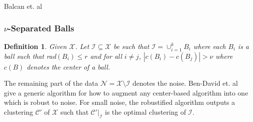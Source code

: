 \documentclass[twoside]{article}
\newcommand{\mc}{\mathcal}
\newtheorem{definition}[theorem]{Definition}
\begin{document}
Balcan et. al \cite{balcan2008discriminative}



\subsubsection*{$\nu$-Separated Balls \cite{ben2014clustering}}
\begin{definition}
Given $\mc X$. Let $\mc I \subseteq \mc X$ be such that $\mc I = \cup_{i=1}^k B_i$ where each $B_i$ is a ball such that rad$(B_i) \le r$ and for all $i \neq j$, $|c(B_i)-c(B_j)| > \nu$ where $c(B)$ denotes the center of a ball.
\end{definition}
The remaining part of the data $\mc N = \mc X \setminus \mc I$ denotes the noise. Ben-David et. al \cite{ben2014clustering} give a generic algorithm for how to augment any center-based algorithm into one which is robust to noise. For small noise, the robustified algorithm outputs a clustering $\mc C'$ of $\mc X$ such that $\mc C'|_{\mc I}$ is the optimal clustering of $\mc I$.



\end{document}
